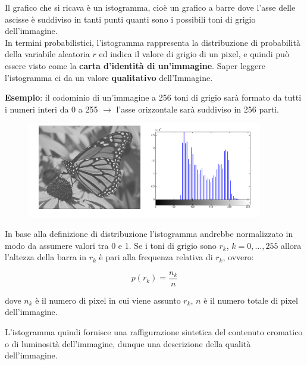 Il grafico che si ricava è un istogramma, cioè un grafico a barre dove l'asse
delle ascisse è suddiviso in tanti punti quanti sono i possibili toni di grigio
dell'immagine.\\

In termini probabilistici, l'istogramma rappresenta la distribuzione di
probabilità della variabile aleatoria $r$ ed indica il valore di grigio di un
pixel, e quindi può essere visto come la \textbf{carta d'identità di
    un'immagine}. Saper leggere l'istogramma ci da un valore \textbf{qualitativo}
dell'Immagine.

\begin{trivlist}
    \item \textbf{Esempio}: il codominio di un'immagine a 256 toni di grigio
    sarà formato da tutti i numeri interi da 0 a 255 $\rightarrow$ l'asse
    orizzontale sarà suddiviso in 256 parti.
\end{trivlist}

\begin{figure}[H]
    \centering
    \includegraphics[width=\linewidth, keepaspectratio]{capitoli/immagini/imgs/esempio-istogramma.png}
\end{figure}

\begin{definition}
    In base alla definizione di distribuzione l'istogramma andrebbe normalizzato
    in modo da assumere valori tra 0 e 1. Se i toni di grigio sono $r_k$, $k =
        0, \ldots, 255$ allora l'altezza della barra in $r_k$ è pari alla frequenza
    relativa di $r_k$, ovvero:

    $$
        p(r_k) = \frac{n_k}{n}
    $$

    dove $n_k$ è il numero di pixel in cui viene assunto $r_k$, $n$ è il numero
    totale di pixel dell'immagine.
\end{definition}

L'istogramma quindi fornisce una raffigurazione sintetica del contenuto
cromatico o di luminosità dell'immagine, dunque una descrizione della qualità
dell'immagine.

